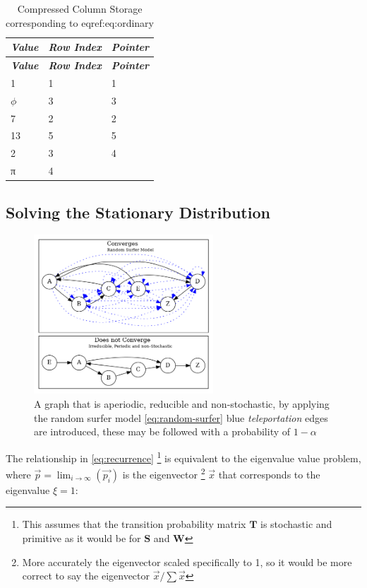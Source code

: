 \documentclass[11pt]{report}
\begin{document}
\hypertarget{table:col-storage}{}
\begin{longtable}[]{@{}lll@{}}
\caption{Compressed Column Storage corresponding to
\label{table:col-storage}
eqref:eq:ordinary}\tabularnewline
\toprule
\emph{\textbf{Value}} & \emph{\textbf{Row Index}} &
\textbf{\emph{Pointer}}\tabularnewline
\midrule
\endfirsthead
\toprule
\emph{\textbf{Value}} & \emph{\textbf{Row Index}} &
\textbf{\emph{Pointer}}\tabularnewline
\midrule
\endhead
1 & 1 & 1\tabularnewline
\(\phi\) & 3 & 3\tabularnewline
7 & 2 & 2\tabularnewline
13 & 5 & 5\tabularnewline
2 & 3 & 4\tabularnewline
π & 4 &\tabularnewline
\bottomrule
\end{longtable}


\subsection{Solving the Stationary Distribution}
\label{solving-stationary-dist}

 \begin{figure}
 \includegraphics[width=0.6\textwidth]{media/dot/random_surfer.dot.png}
 \caption{\label{fig:rseg}A graph that is aperiodic, reducible and non-stochastic, by applying the random surfer model \eqref{eq:random-surfer} blue \emph{teleportation} edges are introduced, these may be followed with a probability of \(1 - \alpha\)}
 \end{figure}

The relationship in \eqref{eq:recurrence} \footnote{This assumes that the transition probability matrix \(\mathbf{T}\) is stochastic and primitive as it would be for \(\mathbf{S}\)
and \(\mathbf{W}\)} is equivalent to the eigenvalue value problem, where
\(\vec{p} = \lim_{i \rightarrow \infty} \left( \vec{p_{i}}\right)\) is the
eigenvector \footnote{More accurately the eigenvector scaled specifically to 1, so it would be more correct to say the eigenvector \(\vec{x} / \sum \vec{x}\)} \(\vec{x}\) that corresponds to the eigenvalue \(\xi=1\):
\end{document}
